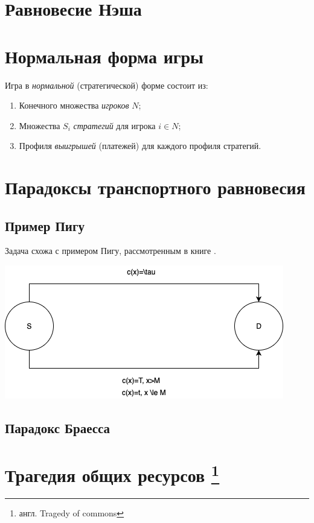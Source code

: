 \section{Равновесие Нэша}

\section{Нормальная форма игры}
Игра в \textit{нормальной} (стратегической) форме состоит из:
\begin{enumerate}
	\item Конечного множества \textit{игроков} $N$;
	\item Множества $S_i$ \textit{стратегий} для игрока $i\in N$;
	\item Профиля \textit{выигрышей} (платежей) для каждого профиля стратегий.
\end{enumerate}\cite[221]{Association:2018aa}

\section{Парадоксы транспортного равновесия}
\subsection{Пример Пигу}\cite[447]{agt2007}
Задача схожа с примером Пигу, рассмотренным в книге \cite{agt2007}.

\includegraphics[scale=.7]{img/pigou}


\subsection{Парадокс Браесса}\cite[65]{gas}

\section{Трагедия общих ресурсов \footnote{англ. Tragedy of commons}}

